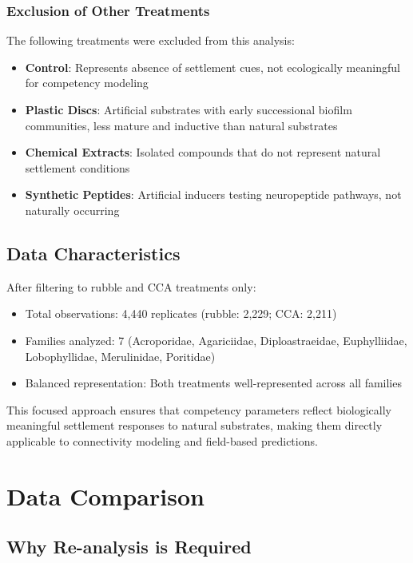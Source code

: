 \documentclass[11pt]{article}
\begin{document}
\subsubsection{Exclusion of Other Treatments}

The following treatments were excluded from this analysis:

\begin{itemize}
    \item \textbf{Control}: Represents absence of settlement cues, not ecologically meaningful for competency modeling
    \item \textbf{Plastic Discs}: Artificial substrates with early successional biofilm communities, less mature and inductive than natural substrates
    \item \textbf{Chemical Extracts}: Isolated compounds that do not represent natural settlement conditions
    \item \textbf{Synthetic Peptides}: Artificial inducers testing neuropeptide pathways, not naturally occurring
\end{itemize}

\subsection{Data Characteristics}

After filtering to rubble and CCA treatments only:
\begin{itemize}
    \item Total observations: 4,440 replicates (rubble: 2,229; CCA: 2,211)
    \item Families analyzed: 7 (Acroporidae, Agariciidae, Diploastraeidae, Euphylliidae, Lobophyllidae, Merulinidae, Poritidae)
    \item Balanced representation: Both treatments well-represented across all families
\end{itemize}

This focused approach ensures that competency parameters reflect biologically meaningful settlement responses to natural substrates, making them directly applicable to connectivity modeling and field-based predictions.

\section{Data Comparison}

\subsection{Why Re-analysis is Required}
\end{document}

